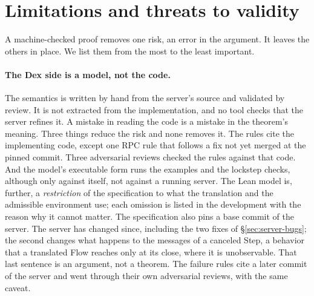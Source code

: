 \section{Limitations and threats to validity}
\label{sec:limitations}

A machine-checked proof removes one risk, an error in the argument. It
leaves the others in place. We list them from the most to the least
important.

\paragraph{The Dex side is a model, not the code.}
The semantics is written by hand from the server's source and validated by
review. It is not extracted from the implementation, and no tool checks
that the server refines it. A mistake in reading the code is a mistake in
the theorem's meaning. Three things reduce the risk and none removes it.
The rules cite the implementing code, except one RPC rule that follows a
fix not yet merged at the pinned commit. Three adversarial reviews checked
the rules against that code. And the model's executable form runs the
examples and the lockstep checks, although only against itself, not against
a running server. The Lean model is, further, a \emph{restriction} of the
specification to what the translation and the admissible environment use;
each omission is listed in the development with the reason why it cannot
matter. The specification also pins a base commit of the server. The server
has changed since, including the two fixes of
\S\ref{sec:server-bugs}; the second changes what happens to the messages of
a canceled Step, a behavior that a translated Flow reaches only at its
close, where it is unobservable. That last sentence is an argument, not a
theorem. The failure rules cite a later commit of the server and went
through their own adversarial reviews, with the same caveat.

